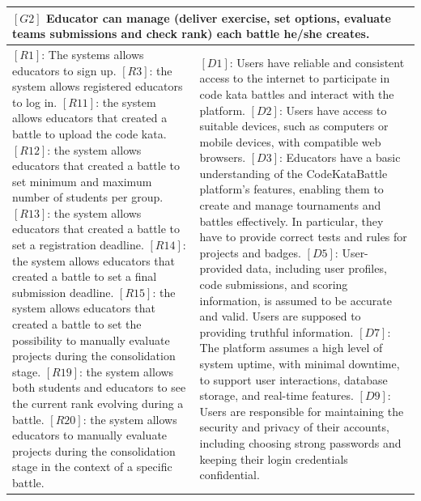 \begin{table}[H]
    \centering
\begin{tabular}{|p{8cm}|p{8cm}|}
  \hline
  \multicolumn{2}{|p{16cm}|}{\textbf{$[G2]$ Educator can manage (deliver exercise, set options, evaluate teams submissions and check rank) each battle he/she creates.}} \\
  \hline
  {
  $[R1]$: The systems allows educators to sign up.
  \newline$[R3]$: the system allows registered educators to log in.
  \newline$[R11]$: the system allows educators that created a battle to upload the code kata.
  \newline$[R12]$: the system allows educators that created a battle to set minimum and maximum number of students per group.
  \newline$[R13]$: the system allows educators that created a battle to set a registration deadline.    \newline$[R14]$: the system allows educators that created a battle to set a final submission deadline.
  \newline$[R15]$: the system allows educators that created a battle to set the possibility to manually evaluate projects during the consolidation stage.
  \newline$[R19]$: the system allows both students and educators to see the current rank evolving during a battle.
  \newline$[R20]$: the system allows educators to manually evaluate projects during the consolidation stage in the context of a specific battle.
  }
  & 
  {
  $[D1]$: Users have reliable and consistent access to the internet to participate in code kata battles and interact with the platform.
  \newline$[D2]$: Users have access to suitable devices, such as computers or mobile devices, with compatible web browsers.
  \newline$[D3]$: Educators have a basic understanding of the CodeKataBattle platform's features, enabling them to create and manage tournaments and battles effectively. In particular, they have to provide correct tests and rules for projects and badges. 
  \newline$[D5]$: User-provided data, including user profiles, code submissions, and scoring information, is assumed to be accurate and valid. Users are supposed to providing truthful information.
  \newline$[D7]$: The platform assumes a high level of system uptime, with minimal downtime, to support user interactions, database storage, and real-time features.
  \newline$[D9]$: Users are responsible for maintaining the security and privacy of their accounts, including choosing strong passwords and keeping their login credentials confidential.
  }
  \\
  \hline
\end{tabular}
\end{table}

